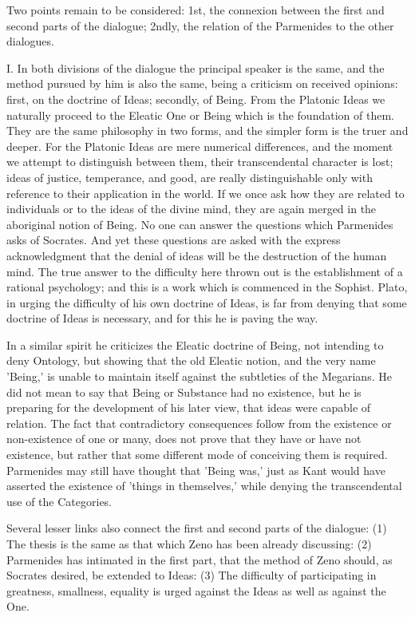 \documentclass[11pt,letter]{article}
\begin{document}
\par  Two points remain to be considered: 1st, the connexion between the first and second parts of the dialogue; 2ndly, the relation of the Parmenides to the other dialogues.

\par  I. In both divisions of the dialogue the principal speaker is the same, and the method pursued by him is also the same, being a criticism on received opinions: first, on the doctrine of Ideas; secondly, of Being. From the Platonic Ideas we naturally proceed to the Eleatic One or Being which is the foundation of them. They are the same philosophy in two forms, and the simpler form is the truer and deeper. For the Platonic Ideas are mere numerical differences, and the moment we attempt to distinguish between them, their transcendental character is lost; ideas of justice, temperance, and good, are really distinguishable only with reference to their application in the world. If we once ask how they are related to individuals or to the ideas of the divine mind, they are again merged in the aboriginal notion of Being. No one can answer the questions which Parmenides asks of Socrates. And yet these questions are asked with the express acknowledgment that the denial of ideas will be the destruction of the human mind. The true answer to the difficulty here thrown out is the establishment of a rational psychology; and this is a work which is commenced in the Sophist. Plato, in urging the difficulty of his own doctrine of Ideas, is far from denying that some doctrine of Ideas is necessary, and for this he is paving the way.

\par  In a similar spirit he criticizes the Eleatic doctrine of Being, not intending to deny Ontology, but showing that the old Eleatic notion, and the very name 'Being,' is unable to maintain itself against the subtleties of the Megarians. He did not mean to say that Being or Substance had no existence, but he is preparing for the development of his later view, that ideas were capable of relation. The fact that contradictory consequences follow from the existence or non-existence of one or many, does not prove that they have or have not existence, but rather that some different mode of conceiving them is required. Parmenides may still have thought that 'Being was,' just as Kant would have asserted the existence of 'things in themselves,' while denying the transcendental use of the Categories.

\par  Several lesser links also connect the first and second parts of the dialogue: (1) The thesis is the same as that which Zeno has been already discussing: (2) Parmenides has intimated in the first part, that the method of Zeno should, as Socrates desired, be extended to Ideas: (3) The difficulty of participating in greatness, smallness, equality is urged against the Ideas as well as against the One.
\end{document}
